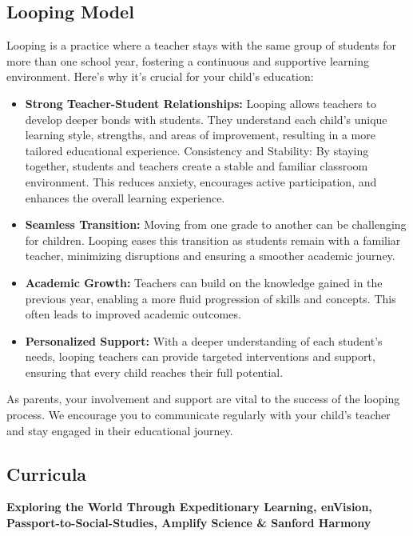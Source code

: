 \documentclass[11pt, letterpaper]{article}
\begin{document}
\subsection{Looping Model}
Looping is a practice where a teacher stays with the same group of students for more than one school year, fostering a continuous and supportive learning environment. Here's why it's crucial for your child's education:
\begin{itemize}
\item \textbf{Strong Teacher-Student Relationships:} Looping allows teachers to develop deeper bonds with students. They understand each child's unique learning style, strengths, and areas of improvement, resulting in a more tailored educational experience.
Consistency and Stability: By staying together, students and teachers create a stable and familiar classroom environment. This reduces anxiety, encourages active participation, and enhances the overall learning experience.
\item \textbf{Seamless Transition:} Moving from one grade to another can be challenging for children. Looping eases this transition as students remain with a familiar teacher, minimizing disruptions and ensuring a smoother academic journey.
\item \textbf{Academic Growth:} Teachers can build on the knowledge gained in the previous year, enabling a more fluid progression of skills and concepts. This often leads to improved academic outcomes.
\item \textbf{Personalized Support:} With a deeper understanding of each student's needs, looping teachers can provide targeted interventions and support, ensuring that every child reaches their full potential.
\end{itemize}
As parents, your involvement and support are vital to the success of the looping process. We encourage you to communicate regularly with your child's teacher and stay engaged in their educational journey.

\subsection{Curricula}
\textbf{Exploring the World Through Expeditionary Learning, enVision, Passport-to-Social-Studies, Amplify Science \& Sanford Harmony}
\end{document}
